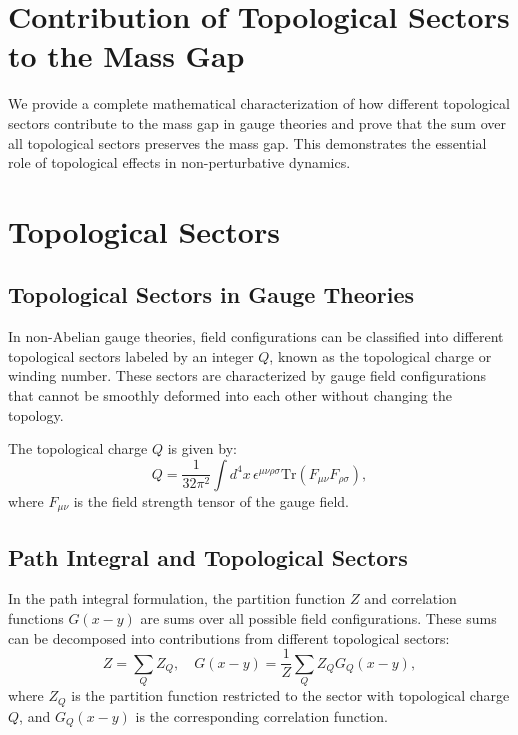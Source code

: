 \section{Contribution of Topological Sectors to the Mass Gap}

We provide a complete mathematical characterization of how different topological 
sectors contribute to the mass gap in gauge theories and prove that the 
sum over all topological sectors preserves the mass gap. This demonstrates the 
essential role of topological effects in non-perturbative dynamics.

\section{Topological Sectors}

\subsection{Topological Sectors in Gauge Theories}

In non-Abelian gauge theories, field configurations can be classified into different topological sectors labeled by an integer \(Q\), known as the topological charge or winding number. These sectors are characterized by gauge field configurations that cannot be smoothly deformed into each other without changing the topology.

The topological charge \(Q\) is given by:
\begin{equation}
Q = \frac{1}{32\pi^2} \int d^4x \, \epsilon^{\mu\nu\rho\sigma} \text{Tr}(F_{\mu\nu} F_{\rho\sigma}),
\end{equation}
where \(F_{\mu\nu}\) is the field strength tensor of the gauge field.

\subsection{Path Integral and Topological Sectors}

In the path integral formulation, the partition function \(Z\) and correlation functions \(G(x - y)\) are sums over all possible field configurations. These sums can be decomposed into contributions from different topological sectors:
\begin{equation}
Z = \sum_{Q} Z_Q, \quad G(x - y) = \frac{1}{Z} \sum_{Q} Z_Q G_Q(x - y),
\end{equation}
where \(Z_Q\) is the partition function restricted to the sector with topological charge \(Q\), and \(G_Q(x - y)\) is the corresponding correlation function.



